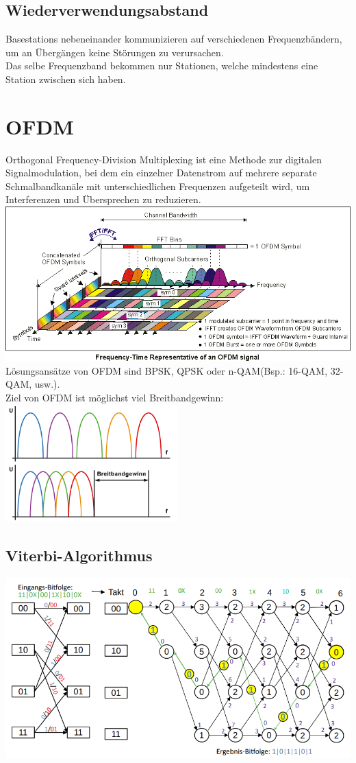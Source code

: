 \documentclass[12pt,a4paper]{article}
\begin{document}
	\subsection*{Wiederverwendungsabstand}
		Basestations nebeneinander kommunizieren auf verschiedenen Frequenzbändern, um an Übergängen keine Störungen zu verursachen.\\
		Das selbe Frequenzband bekommen nur Stationen, welche mindestens eine Station zwischen sich haben.
	
\section{OFDM}
	Orthogonal Frequency-Division Multiplexing ist eine Methode zur digitalen Signalmodulation, bei dem ein einzelner Datenstrom auf mehrere separate Schmalbandkanäle mit unterschiedlichen Frequenzen aufgeteilt wird, um Interferenzen und Übersprechen zu reduzieren.
	\includegraphics[width=\textwidth]{Bilder/ofdm.png}
	Lösungsansätze von OFDM sind BPSK, QPSK oder n-QAM(Bsp.: 16-QAM, 32-QAM, usw.).\\
	Ziel von OFDM ist möglichst viel Breitbandgewinn:\\
	\includegraphics[width=0.5\textwidth]{Bilder/ofdm_breitbandgewinn.PNG}
	
	\subsection{Viterbi-Algorithmus}
		\includegraphics[width=\textwidth]{Bilder/viterbi.PNG}
\end{document}
